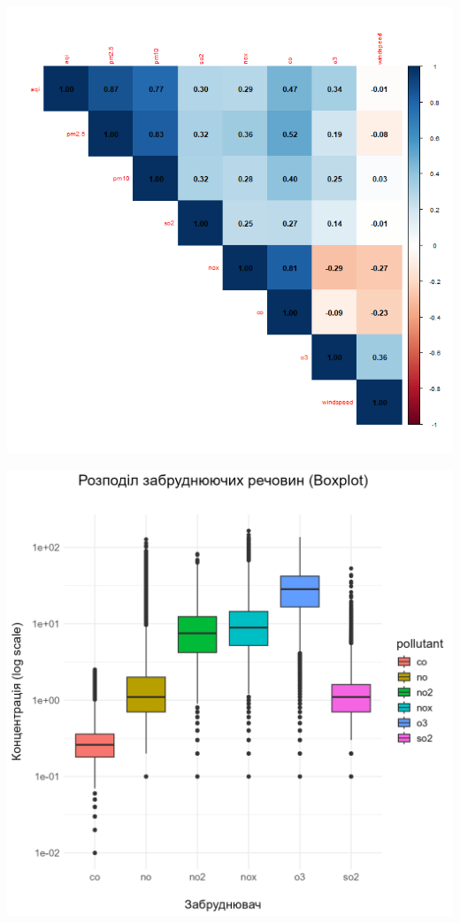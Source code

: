 \documentclass[./report.tex]{subfiles}
\begin{document}
\begin{enumerate}
  \includegraphics[width=6in]{plots/question2/air_corr_matrix.png}
    
  \includegraphics[width=6in]{plots/question2/boxplot_pollutants.png}
    

\end{enumerate}
\end{document}
